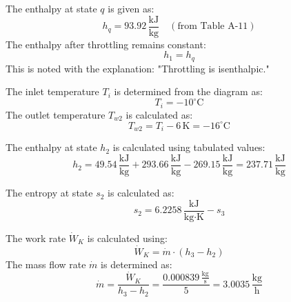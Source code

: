 The enthalpy at state \(q\) is given as:  
\[
h_q = 93.92 \, \frac{\text{kJ}}{\text{kg}} \quad (\text{from Table A-11})
\]  
The enthalpy after throttling remains constant:  
\[
h_1 = h_q
\]  
This is noted with the explanation: "Throttling is isenthalpic."  

The inlet temperature \(T_i\) is determined from the diagram as:  
\[
T_i = -10^\circ\text{C}
\]  
The outlet temperature \(T_{w2}\) is calculated as:  
\[
T_{w2} = T_i - 6 \, \text{K} = -16^\circ\text{C}
\]  

The enthalpy at state \(h_2\) is calculated using tabulated values:  
\[
h_2 = 49.54 \, \frac{\text{kJ}}{\text{kg}} + 293.66 \, \frac{\text{kJ}}{\text{kg}} - 269.15 \, \frac{\text{kJ}}{\text{kg}} = 237.71 \, \frac{\text{kJ}}{\text{kg}}
\]  

The entropy at state \(s_2\) is calculated as:  
\[
s_2 = 6.2258 \, \frac{\text{kJ}}{\text{kg·K}} - s_3
\]

The work rate \( \dot{W}_K \) is calculated using:  
\[
\dot{W}_K = \dot{m} \cdot (h_3 - h_2)
\]  
The mass flow rate \( \dot{m} \) is determined as:  
\[
\dot{m} = \frac{\dot{W}_K}{h_3 - h_2} = \frac{0.000839 \, \frac{\text{kg}}{\text{s}}}{5} = 3.0035 \, \frac{\text{kg}}{\text{h}}
\]